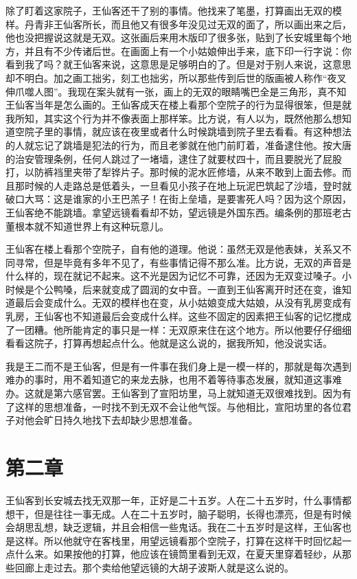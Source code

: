 除了盯着这家院子，王仙客还干了别的事情。他找来了笔墨，打算画出无双的模样。丹青非王仙客所长，而且他又有很多年没见过无双的面了，所以画出来之后，他也没把握说这就是无双。这张画后来用木版印了很多张，贴到了长安城里每个地方，并且有不少传诸后世。在画面上有一个小姑娘伸出手来，底下印一行字说：你看到我了吗？就王仙客来说，这意思是足够明白的了。但是对于别人来说，这意思却不明白。加之画工拙劣，刻工也拙劣，所以那些传到后世的版画被人称作“夜叉伸爪噬人图”。我现在案头就有一张，画上的无双的眼睛嘴巴全是三角形，真不知王仙客当年是怎么画的。王仙客成天在楼上看那个空院子的行为显得很笨，但是就我所知，其实这个行为并不像表面上那样笨。比方说，有人以为，既然他那么想知道空院子里的事情，就应该在夜里或者什么时候跳墙到院子里去看看。有这种想法的人就忘记了跳墙是犯法的行为，而且老爹就在他门前盯着，准备逮住他。按大唐的治安管理条例，任何人跳过了一堵墙，逮住了就要杖四十，而且要脱光了屁股打，以防裤裆里夹带了犁铧片子。那时候的泥水匠修墙，从来不敢到上面去修。而且那时候的人走路总是低着头，一旦看见小孩子在地上玩泥巴筑起了沙墙，登时就破口大骂：这是谁家的小王巴羔子！在街上垒墙，是要害死人吗？因为这个原因，王仙客绝不能跳墙。拿望远镜看看却不妨，望远镜是外国东西。编条例的那班老古董根本就不知道世界上有这种玩意儿。 

王仙客在楼上看那个空院子，自有他的道理。他说：虽然无双是他表妹，关系又不同寻常，但是毕竟有多年不见了，有些事情记得不那么准。比方说，无双的声音是什么样的，现在就记不起来。这不光是因为记忆不可靠，还因为无双变过嗓子。小时候是个公鸭嗓，后来就变成了圆润的女中音。一直到王仙客离开时还在变，谁知道最后会变成什么。无双的模样也在变，从小姑娘变成大姑娘，从没有乳房变成有乳房，王仙客也不知道最后会变成什么样。这些不固定的因素把王仙客的记忆搅成了一团糟。他所能肯定的事只是一样：无双原来住在这个地方。所以他要仔仔细细看看这院子，打算再想起点什么。他就是这么说的，据我所知，他没说实话。 

我是王二而不是王仙客，但是有一件事在我们身上是一模一样的，那就是每次遇到难办的事时，用不着知道它的来龙去脉，也用不着等待事态发展，就知道这事难办。这就是第六感官罢。王仙客到了宣阳坊里，马上就知道无双很难找到。因为有了这样的思想准备，一时找不到无双不会让他气馁。与他相比，宣阳坊里的各位君子对他会旷日持久地找下去却缺少思想准备。

\section{第二章}

王仙客到长安城去找无双那一年，正好是二十五岁。人在二十五岁时，什么事情都想干，但是往往一事无成。人在二十五岁时，脑子聪明，长得也漂亮，但是有时候会胡思乱想，缺乏逻辑，并且会相信一些鬼话。我在二十五岁时是这样，王仙客也是这样。所以他就守在客栈里，用望远镜看那个空院子，打算在这样干时回忆起一点什么来。如果按他的打算，他应该在镜筒里看到无双，在夏天里穿着轻纱，从那些回廊上走过去。那个卖给他望远镜的大胡子波斯人就是这么说的。 

